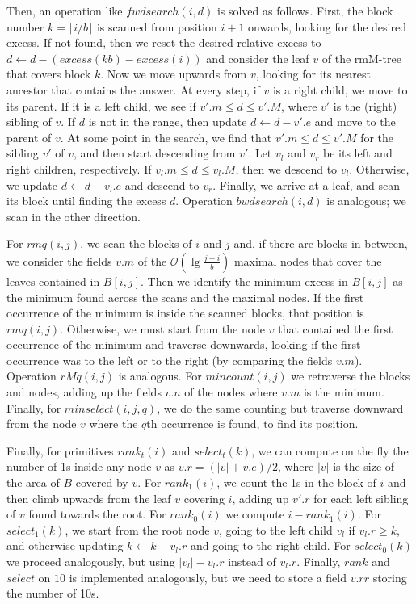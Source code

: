 \documentclass[11pt]{article}
\renewcommand{\log}{\lg}
\newcommand{\0}{\mathit{0}}
\newcommand{\1}{\mathit{1}}
\newcommand{\rank}{\mathit{rank}}
\newcommand{\select}{\mathit{select}}
\newcommand{\excess}{\mathit{excess}}
\newcommand{\fwdsearch}{\mathit{fwdsearch}}
\newcommand{\bwdsearch}{\mathit{bwdsearch}}
\newcommand{\rmq}{\mathit{rmq}}
\newcommand{\rMq}{\mathit{rMq}}
\newcommand{\mincount}{\mathit{mincount}}
\newcommand{\minselect}{\mathit{minselect}}
\newcommand{\Oh}[1]{\mathcal{O}\!\left(#1\right)}
\begin{document}
Then, an operation like $\fwdsearch(i,d)$ is solved as follows. First, the block
number $k=\lceil i/b\rceil$ is scanned from position $i+1$ onwards, looking for 
the desired excess. If not found, then we reset the desired relative excess
to $d \leftarrow d - (\excess(kb)-\excess(i))$ and consider the leaf $v$ of 
the rmM-tree that covers block $k$. Now we move upwards from $v$, looking for 
its nearest ancestor that contains the answer. At every step, if $v$ is a
right child, we move to its parent. If it is a left child, we see if
$v'.m \le d \le v'.M$, where $v'$ is the (right) sibling of $v$. If $d$ is not 
in the range, then update $d \leftarrow d - v'.e$ and move to the parent of $v$.
At some point in the search, we find that $v'.m \le d \le v'.M$ for the
sibling $v'$ of $v$, and then start descending from $v'$. Let $v_l$ and $v_r$ 
be its left and right children, respectively. 
If $v_l.m \le d \le v_l.M$, then we descend to $v_l$. Otherwise,
we update $d \leftarrow d - v_l.e$ and descend to $v_r$. Finally, we arrive at
a leaf, and scan its block until finding the excess $d$.
Operation $\bwdsearch(i,d)$ is analogous; we scan in the other direction.

For $\rmq(i,j)$, we scan the blocks of $i$ and $j$ and, if there are blocks
in between, we consider the fields $v.m$ of the $\Oh{\log \frac{j-i}{b}}$
maximal nodes that cover the leaves contained in $B[i,j]$. Then we identify
the minimum excess in $B[i,j]$ as the minimum found across the scans and the
maximal nodes. If the first occurrence of the minimum is inside the scanned blocks, that
position is $\rmq(i,j)$. Otherwise, we must start from the node $v$ that
contained the first occurrence of the minimum and traverse downwards, looking
if the first occurrence was to the left or to the right (by comparing the
fields $v.m$). Operation $\rMq(i,j)$ is analogous. For $\mincount(i,j)$ we
retraverse the blocks and nodes, adding up the fields
$v.n$ of the nodes where $v.m$ is the minimum. Finally,
for $\minselect(i,j,q)$, we do the same counting but traverse downward from
the node $v$ where the $q$th occurrence is found, to find its position.

Finally, for primitives $\rank_t(i)$ and $\select_t(k)$, we
can compute on the fly the number of 1s inside any node $v$ as
$v.r = (|v|+v.e)/2$, where $|v|$ is the size of the area of $B$ covered by
$v$. For $\rank_1(i)$, we count the 1s
in the block of $i$ and then climb upwards from the leaf $v$ covering $i$,
adding up $v'.r$ for each left sibling of $v$ found towards the root. For
$\rank_0(i)$ we compute $i-\rank_1(i)$. For $\select_1(k)$, we start from the
root node $v$, going to the left child $v_l$ if $v_l.r \ge k$, and otherwise
updating $k \leftarrow k-v_l.r$ and going to the right child. For
$\select_0(k)$ we proceed analogously, but using $|v_l|-v_l.r$ instead of
$v_l.r$. Finally, $\rank$ and $\select$ on $10$ is implemented analogously,
but we need to store a field $v.rr$ storing the number of 10s.
\end{document}
